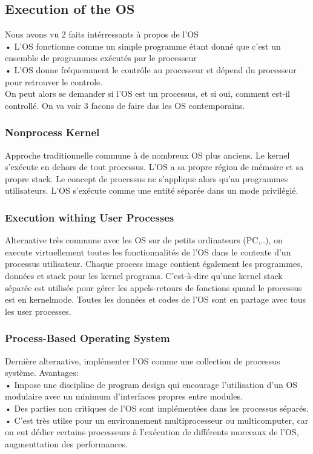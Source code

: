 \subsection{Execution of the OS}
Nous avons vu 2 faits intérressants à propos de l'OS \\
• L'OS fonctionne comme un simple programme étant donné que c'est un ensemble de programmes exécutés par le processeur \\
• L'OS donne fréquemment le contrôle au processeur et dépend du processeur pour retrouver le controle. \\
On peut alors se demander si l'OS est un processus, et si oui, comment est-il controllé. On va voir 3 facons de faire das les OS contemporains.
\subsubsection{Nonprocess Kernel}
Approche traditionnelle commune à de nombreux OS plus anciens. Le kernel s'exécute en dehors de tout processus. L'OS a sa propre région de mémoire et sa propre stack. Le concept de processus ne s'applique alors qu'au programmes utilisateurs. L'OS s'exécute comme une entité séparée dans un mode privilégié.
\subsubsection{Execution withing User Processes}
Alternative très commune avec les OS sur de petits ordinateurs (PC,..), on execute virtuellement toutes les fonctionnalités de l'OS dans le contexte d'un processus utilisateur. Chaque process image contient également les programmes, données et stack pour les kernel programs. C'est-à-dire qu'une kernel stack séparée est utilisée pour gérer les appels-retours de fonctions quand le processus est en kernelmode. Toutes les données et codes de l'OS sont en partage avec tous les user processes.
\subsubsection{Process-Based Operating System}
Dernière alternative, implémenter l'OS comme une collection de processus système. Avantages: \\
• Impose une discipline de program design qui encourage l'utilisation d'un OS modulaire avec un minimum d'interfaces propres entre modules. \\
• Des parties non critiques de l'OS sont implémentées dans les processus séparés. \\
• C'est très utilse pour un environnement multiprocesseur ou multicomputer, car on eut dédier certains processeurs à l'exécution de différents morceaux de l'OS, augmenttation des performances.
